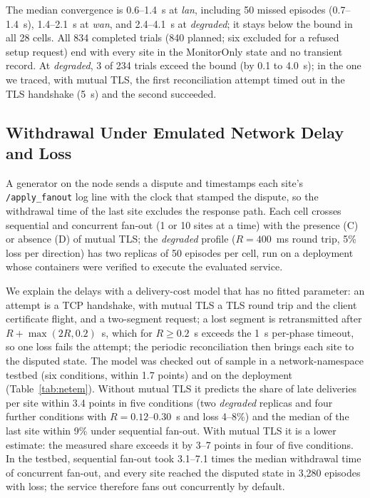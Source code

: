 \documentclass[journal]{IEEEtran}
\theoremstyle{definition}
\begin{document}
The median convergence is 0.6--1.4~s at \emph{lan}, including 50 missed episodes (0.7--1.4~s), 1.4--2.1~s at \emph{wan}, and 2.4--4.1~s at \emph{degraded}; it stays below the bound in all 28 cells. All 834 completed trials (840 planned; six excluded for a refused setup request) end with every site in the MonitorOnly state and no transient record. At \emph{degraded}, 3 of 234 trials exceed the bound (by 0.1 to 4.0~s); in the one we traced, with mutual TLS, the first reconciliation attempt timed out in the TLS handshake (5~s) and the second succeeded.

\subsection{Withdrawal Under Emulated Network Delay and Loss}
\label{sec:netem-results}
A generator on the node sends a dispute and timestamps each site's \texttt{/apply\_fanout} log line with the clock that stamped the dispute, so the withdrawal time of the last site excludes the response path. Each cell crosses sequential and concurrent fan-out (1 or 10 sites at a time) with the presence (C) or absence (D) of mutual TLS; the \emph{degraded} profile ($R=400$~ms round trip, 5\% loss per direction) has two replicas of 50 episodes per cell, run on a deployment whose containers were verified to execute the evaluated service.

We explain the delays with a delivery-cost model that has no fitted parameter: an attempt is a TCP handshake, with mutual TLS a TLS round trip and the client certificate flight, and a two-segment request; a lost segment is retransmitted after $R+\max(2R,0.2)$~s, which for $R\ge0.2$~s exceeds the 1~s per-phase timeout, so one loss fails the attempt; the periodic reconciliation then brings each site to the disputed state. The model was checked out of sample in a network-namespace testbed (six conditions, within 1.7 points) and on the deployment (Table~\ref{tab:netem}). Without mutual TLS it predicts the share of late deliveries per site within 3.4 points in five conditions (two \emph{degraded} replicas and four further conditions with $R=0.12$--0.30~s and loss 4--8\%) and the median of the last site within 9\% under sequential fan-out. With mutual TLS it is a lower estimate: the measured share exceeds it by 3--7 points in four of five conditions. In the testbed, sequential fan-out took 3.1--7.1 times the median withdrawal time of concurrent fan-out, and every site reached the disputed state in 3,280 episodes with loss; the service therefore fans out concurrently by default.
\end{document}
